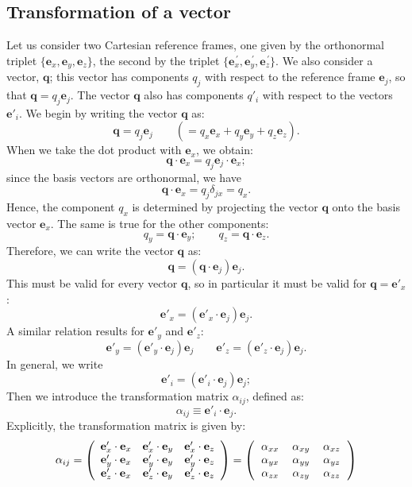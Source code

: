 \subsection{Transformation of a vector}
Let us consider two Cartesian reference frames, one given by the 
orthonormal triplet $\{\mathbf{e}_x,\mathbf{e}_y,\mathbf{e}_z\}$, the second by 
the triplet 
$\{\mathbf{e}_x^{\,\prime},\mathbf{e}_y^{\,\prime},\mathbf{e}_z^{\,\prime}\}$.  
We also consider a vector, $\mathbf{q}$; this vector has components $q_j$ with respect 
to the reference frame $\mathbf{e}_j$, so that $\mathbf{q}=q_j\mathbf{e}_j$.  
The vector $\mathbf{q}$ also has components $q'_i$ with respect to the vectors $\mathbf{e}'_i$.  
We begin by writing the vector $\mathbf{q}$ as:
\[
	\mathbf{q} = q_j\mathbf{e}_j\qquad (= q_x\mathbf{e}_x + q_y\mathbf{e}_y+q_z\mathbf{e}_z).
\]
When we take the dot product with $\mathbf{e}_x$, we obtain:
\[
	\mathbf{q}\cdot\mathbf{e}_x = q_j \mathbf{e}_j\cdot\mathbf{e}_x;
\]
since the basis vectors are orthonormal, we have
\[
	\mathbf{q}\cdot\mathbf{e}_x = q_j \delta_{jx} = q_x.
\]
Hence, the component $q_x$ is determined by projecting the vector $\mathbf{q}$ onto the 
basis vector $\mathbf{e}_x$.  The same is true for the other components:
\[
		q_y = \mathbf{q}\cdot\mathbf{e}_y;\qquad
		q_z = \mathbf{q}\cdot\mathbf{e}_z.
\]
Therefore, we can write the vector $\mathbf{q}$ as:
\[
	\mathbf{q} = (\mathbf{q}\cdot\mathbf{e}_j) \mathbf{e}_j.
\]
This must be valid for every vector $\mathbf{q}$, so in particular it must be valid for $\mathbf{q}=\mathbf{e}'_x$:
\[
	\mathbf{e}'_x = (\mathbf{e}'_x\cdot\mathbf{e}_j) \mathbf{e}_j.
\]
A similar relation results for $\mathbf{e}'_y$ and $\mathbf{e}'_z$:
\[
	\mathbf{e}'_y = (\mathbf{e}'_y\cdot\mathbf{e}_j) \mathbf{e}_j\qquad \mathbf{e}'_z = (\mathbf{e}'_z\cdot\mathbf{e}_j) \mathbf{e}_j.
\]
In general, we write
\[
	\mathbf{e}'_i = (\mathbf{e}'_i\cdot\mathbf{e}_j) \mathbf{e}_j;
\]
Then we introduce the transformation matrix $\alpha_{ij}$, defined as:
\[	
	\alpha_{ij} \equiv \mathbf{e}'_i\cdot\mathbf{e}_j.
\]
Explicitly, the transformation matrix is given by:
\[
	\alpha_{ij} = \left(\begin{array}{ccc}
	\mathbf{e}'_x\cdot\mathbf{e}_x & \mathbf{e}'_x\cdot\mathbf{e}_y & \mathbf{e}'_x\cdot\mathbf{e}_z\\
	\mathbf{e}'_y\cdot\mathbf{e}_x & \mathbf{e}'_y\cdot\mathbf{e}_y & \mathbf{e}'_y\cdot\mathbf{e}_z\\
	\mathbf{e}'_z\cdot\mathbf{e}_x & \mathbf{e}'_z\cdot\mathbf{e}_y & \mathbf{e}'_z\cdot\mathbf{e}_z\end{array}\right)=
	\left(\begin{tabular}{ccc}\centering $\alpha_{xx}$ & 
$\alpha_{xy}$ & $\alpha_{xz}$ \\
$\alpha_{yx}$ & $\alpha_{yy}$ & $\alpha_{yz}$ \\
$\alpha_{zx}$ & $\alpha_{zy}$ & $\alpha_{zz}$ \\
\end{tabular}\right)
\]
